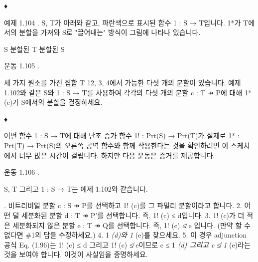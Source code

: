 \documentclass[11pt, a4paper, twoside, openany]{book}
\begin{document}
\par\medskip
♦

\par\medskip
예제 1.104 . S, T\hspace{0pt}가 아래와 같고, 파란색으로 표시된 함수 1 : S → T\hspace{0pt}입니다. 1*가 T\hspace{0pt}에서의 분할을 가져와 S\hspace{0pt}로 "끌어내는" 방식이 그림에 나타나 있습니다.

\par\medskip
S
분할된 T
분할된 S

\par\medskip
운동 1.105 .

\par\medskip
세 가지 원소를 가진 집합 T  {12, 3, 4}에서 가능한 다섯 개의 분할이 있습니다. 예제 1.102\hspace{0pt}와 같은 S\hspace{0pt}와 1 : S → T\hspace{0pt}를 사용하여 각각의 다섯 개의 분할 c : T ↠ P\hspace{0pt}에 대해 1* (c)가 S\hspace{0pt}에서의 분할을 결정하세요.

\par\medskip
♦

\par\medskip
어떤 함수 1 : S → T\hspace{0pt}에 대해 단조 증가 함수 1! : Prt(S) → Prt(T)가 실제로 1* : Prt(T) → Prt(S)의 오른쪽 공역 함수와 함께 작용한다는 것을 확인하려면 이 스케치에서 너무 많은 시간이 걸립니다. 하지만 다음 운동은 증거를 제공합니다.

\par\medskip
운동 1.106 .

\par\medskip
S, T 그리고 1 : S → T\hspace{0pt}는 예제 1.102\hspace{0pt}와 같습니다.

\par{}. 비트리비얼 분할 c : S ↠ P\hspace{0pt}를 선택하고 1! (c)를 그 파밀리 분할이라고 합니다.
2. 어떤 덜 세분화된 분할 d : T ↠ P'를 선택합니다. 즉, 1! (c) ≤ d\hspace{0pt}입니다.
3. 1! (c)가 더 적은 세분화되지 않은 분할 e : T ↠ Q\hspace{0pt}를 선택합니다. 즉, 1! (c) ≰ e 입니다. (만약 할 수 없다면 \#1\hspace{0pt}의 답을 수정하세요.)
4. 1\textit{ (d)와 1} (e)를 찾으세요.
5. 이 경우 adjunction 공식 Eq. (1.96)는 1! (c) ≤ d 그리고 1! (c) ≰ e\hspace{0pt}이므로 c ≤ 1\textit{ (d) 그리고 c ≰ 1} (e)라는 것을 보여야 합니다. 이것이 사실임을 증명하세요.
\end{document}
